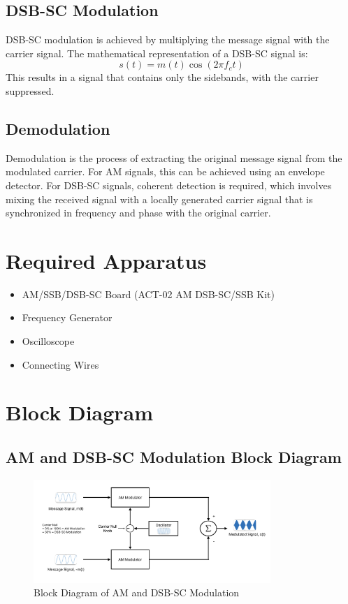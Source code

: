 \documentclass[12pt]{article}
\begin{document}
\subsection*{DSB-SC Modulation}
DSB-SC modulation is achieved by multiplying the message signal with the carrier signal. The mathematical representation of a DSB-SC signal is:
\[
    s(t) = m(t) \cos(2 \pi f_c t)
\]
This results in a signal that contains only the sidebands, with the carrier suppressed.

\subsection*{Demodulation}
Demodulation is the process of extracting the original message signal from the modulated carrier. For AM signals, this can be achieved using an envelope detector. For DSB-SC signals, coherent detection is required, which involves mixing the received signal with a locally generated carrier signal that is synchronized in frequency and phase with the original carrier.

\section*{Required Apparatus}
\begin{itemize}
    \item AM/SSB/DSB-SC Board (ACT-02 AM DSB-SC/SSB Kit)
    \item Frequency Generator
    \item Oscilloscope
    \item Connecting Wires
\end{itemize}

\section*{Block Diagram}
\subsection*{AM and DSB-SC Modulation Block Diagram}
\begin{figure}[H]
    \centering
    \includegraphics[width=0.8\textwidth]{bm.png}
    \caption{Block Diagram of AM and DSB-SC Modulation}
    \label{fig:modulation_block_diagram}
\end{figure}
\end{document}
